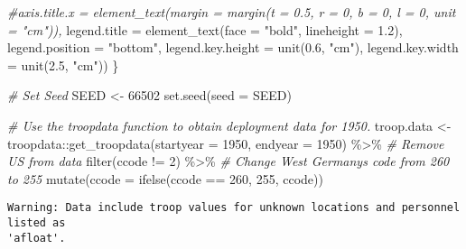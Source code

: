 \documentclass[
]{book}
\newenvironment{Shaded}{\begin{snugshade}}{\end{snugshade}}
\newcommand{\AttributeTok}[1]{\textcolor[rgb]{0.77,0.63,0.00}{#1}}
\newcommand{\CommentTok}[1]{\textcolor[rgb]{0.56,0.35,0.01}{\textit{#1}}}
\newcommand{\DecValTok}[1]{\textcolor[rgb]{0.00,0.00,0.81}{#1}}
\newcommand{\FloatTok}[1]{\textcolor[rgb]{0.00,0.00,0.81}{#1}}
\newcommand{\FunctionTok}[1]{\textcolor[rgb]{0.00,0.00,0.00}{#1}}
\newcommand{\NormalTok}[1]{#1}
\newcommand{\OtherTok}[1]{\textcolor[rgb]{0.56,0.35,0.01}{#1}}
\newcommand{\SpecialCharTok}[1]{\textcolor[rgb]{0.00,0.00,0.00}{#1}}
\newcommand{\StringTok}[1]{\textcolor[rgb]{0.31,0.60,0.02}{#1}}
\theoremstyle{definition}
\theoremstyle{definition}
\theoremstyle{definition}
\theoremstyle{definition}
\theoremstyle{remark}
\begin{document}
\begin{Shaded}
\begin{Highlighting}[]
          \CommentTok{\#axis.title.x = element\_text(margin = margin(t = 0.5, r = 0, b = 0, l = 0, unit = "cm")),}
          \AttributeTok{legend.title =} \FunctionTok{element\_text}\NormalTok{(}\AttributeTok{face =} \StringTok{"bold"}\NormalTok{, }\AttributeTok{lineheight =} \FloatTok{1.2}\NormalTok{),}
          \AttributeTok{legend.position =} \StringTok{"bottom"}\NormalTok{,}
          \AttributeTok{legend.key.height =} \FunctionTok{unit}\NormalTok{(}\FloatTok{0.6}\NormalTok{, }\StringTok{"cm"}\NormalTok{),}
          \AttributeTok{legend.key.width =} \FunctionTok{unit}\NormalTok{(}\FloatTok{2.5}\NormalTok{, }\StringTok{"cm"}\NormalTok{))}
\NormalTok{\}}


\CommentTok{\# Set Seed}
\NormalTok{SEED }\OtherTok{\textless{}{-}} \DecValTok{66502}
\FunctionTok{set.seed}\NormalTok{(}\AttributeTok{seed =}\NormalTok{ SEED)}
\end{Highlighting}
\end{Shaded}

\begin{Shaded}
\begin{Highlighting}[]
\CommentTok{\# Use the troopdata function to obtain deployment data for 1950.}
\NormalTok{troop.data }\OtherTok{\textless{}{-}}\NormalTok{ troopdata}\SpecialCharTok{::}\FunctionTok{get\_troopdata}\NormalTok{(}\AttributeTok{startyear =} \DecValTok{1950}\NormalTok{, }\AttributeTok{endyear =} \DecValTok{1950}\NormalTok{) }\SpecialCharTok{\%\textgreater{}\%} 
  \CommentTok{\# Remove US from data}
  \FunctionTok{filter}\NormalTok{(ccode }\SpecialCharTok{!=} \DecValTok{2}\NormalTok{) }\SpecialCharTok{\%\textgreater{}\%} 
  \CommentTok{\# Change West Germany\textquotesingle{}s code from 260 to 255}
  \FunctionTok{mutate}\NormalTok{(}\AttributeTok{ccode =} \FunctionTok{ifelse}\NormalTok{(ccode }\SpecialCharTok{==} \DecValTok{260}\NormalTok{, }\DecValTok{255}\NormalTok{, ccode))}
\end{Highlighting}
\end{Shaded}

\begin{verbatim}
Warning: Data include troop values for unknown locations and personnel listed as
'afloat'.
\end{verbatim}
\end{document}
